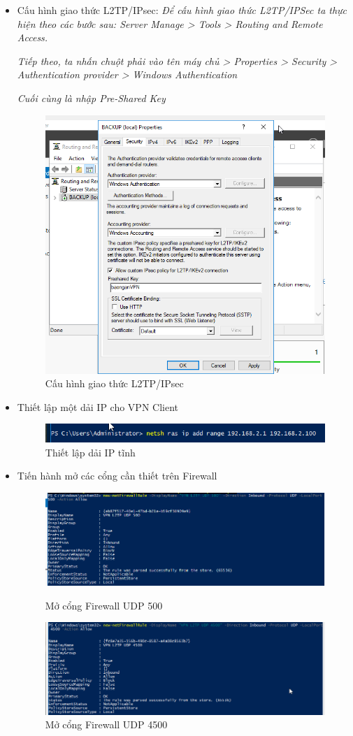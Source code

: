 \begin{itemize}
    \item Cấu hình giao thức L2TP/IPsec: 
    \textit{Để cấu hình giao thức L2TP/IPSec ta thực hiện theo các bước sau: Server Manage > Tools > Routing and Remote Access.}
    
    \textit{Tiếp theo, ta nhấn chuột phải vào tên máy chủ > Properties > Security > Authentication provider > Windows Authentication}

    \textit{Cuối cùng là nhập Pre-Shared Key}
    \begin{figure}[htbp]
        \centering
        \includegraphics[width=0.5\linewidth]{coreRemoteAccess/key-l2tp.png}
        \caption{Cấu hình giao thức L2TP/IPsec}
    \end{figure}
    \newpage
    
    \item Thiết lập một dải IP cho VPN Client
    \begin{figure}[htbp]
        \centering
        \includegraphics[width=0.5\linewidth]{coreRemoteAccess/setIPClient.png}
        \caption{Thiết lập dải IP tĩnh}
    \end{figure}
    

    \item Tiến hành mở các cổng cần thiết trên Firewall
    \begin{figure}[htbp]
        \centering
        \includegraphics[width=0.5\linewidth]{coreRemoteAccess/openPort1.png}
        \caption{Mở cổng Firewall UDP 500}
        \vspace{2em}
        \includegraphics[width=0.5\linewidth]{coreRemoteAccess/openPort2.png}
        \caption{Mở cổng Firewall UDP 4500}
    \end{figure}
    

\end{itemize}
